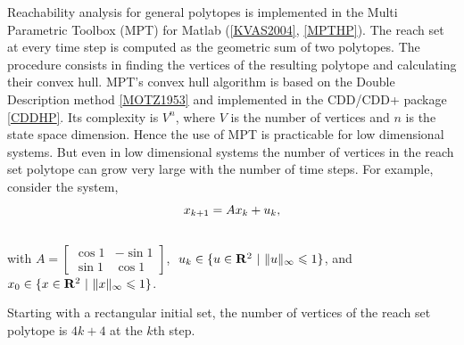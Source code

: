 \documentclass[letterpaper,10pt,english]{sphinxmanual}
\begin{document}
Reachability analysis for general polytopes is implemented in the Multi
Parametric Toolbox (MPT) for Matlab ({\hyperref[chap_implement:kvas2004]{{[}KVAS2004{]}}}, {\hyperref[chap_install:mpthp]{{[}MPTHP{]}}}). The reach set at every time step
is computed as the geometric sum of two polytopes. The procedure
consists in finding the vertices of the resulting polytope and
calculating their convex hull. MPT’s convex hull algorithm is based on
the Double Description method {\hyperref[chap_intro:motz1953]{{[}MOTZ1953{]}}} and implemented in
the CDD/CDD+ package {\hyperref[chap_intro:cddhp]{{[}CDDHP{]}}}. Its complexity is
$V^n$, where $V$ is the number of vertices and $n$ is
the state space dimension. Hence the use of MPT is practicable for low
dimensional systems. But even in low dimensional systems the number of
vertices in the reach set polytope can grow very large with the number
of time steps. For example, consider the system,
\begin{gather}
\begin{split}x_{k+1} = Ax_k + u_k ,\end{split}\notag\\\begin{split}\end{split}\notag
\end{gather}
with $A=\left[\begin{array}{cc}\cos 1 & -\sin 1\\ \sin 1 & \cos 1\end{array}\right]$,
$\ u_k \in \{u\in {\bf R}^2 ~|~ \|u\|_{\infty}\leqslant1\}$,
and $x_0 \in \{x\in {\bf R}^2 ~|~ \|x\|_{\infty}\leqslant1\}$.

Starting with a rectangular initial set, the number of vertices of the
reach set polytope is $4k + 4$ at the $k$th step.
\end{document}
